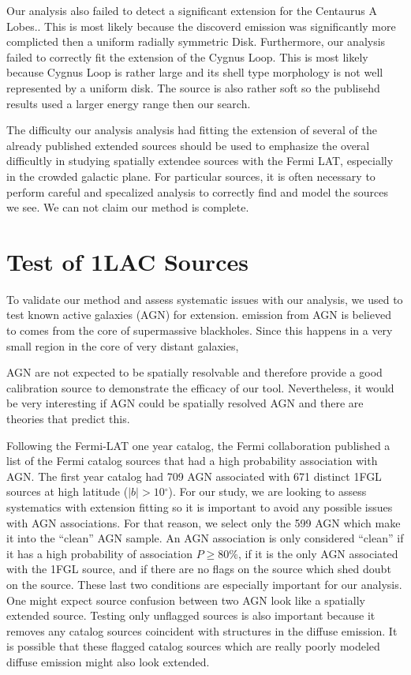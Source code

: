 \documentclass[12pt,preprint]{aastex}
\newcommand{\gev}{\text{GeV}\xspace}
\renewcommand{\deg}{\ensuremath{^\circ}\xspace}
\newcommand{\pointlike}{\text{\em pointlike}\xspace}
\begin{document}
Our analysis also failed to detect a significant extension for the
Centaurus A Lobes.\cite{CenA paper}. This is most likely because the
discoverd emission was significantly more complicted then a uniform
radially symmetric Disk.  Furthermore, our analysis failed to correctly
fit the extension of the Cygnus Loop\cite{Cygnus Loop Paper}.  This is
most likely because Cygnus Loop is rather large and its shell type
morphology is not well represented by a uniform disk. The source is
also rather soft so the publisehd results used a larger energy range
then our search.

The difficulty our analysis analysis had fitting the extension of several
of the already published extended sources should be used to emphasize the
overal difficultly in studying spatially extendee sources with the Fermi
LAT, especially in the crowded galactic plane. For particular sources,
it is often necessary to perform careful and specalized analysis to
correctly find and model the sources we see. We can not claim our method
is complete.

\section{Test of 1LAC Sources}

To validate our method and assess systematic issues with our
analysis, we used \pointlike to test known active galaxies (AGN) for extension.
\gev emission from AGN is believed to comes from the
core of supermassive blackholes. Since this happens in a very small region
in the core of very distant galaxies,

AGN are not expected to be spatially resolvable and therefore
provide a good calibration source to demonstrate the efficacy of our
tool. Nevertheless, it would be very interesting if AGN could be
spatially resolved AGN and there are theories that predict
this\cite{pair_halo_paper}.

Following the Fermi-LAT one year catalog, the Fermi collaboration
published a list of the Fermi catalog sources that had a high probability
association with AGN. The first year catalog had 709 AGN associated with
671 distinct 1FGL sources at high latitude ($|b|>10\deg$).  For our
study, we are looking to assess systematics with extension fitting so
it is important to avoid any possible issues with AGN associations.
For that reason, we select only the 599 AGN which make it into the
``clean'' AGN sample. An AGN association is only considered ``clean''
if it has a high probability of association $P\ge 80\%$, if it is the
only AGN associated with the 1FGL source, and if there are no flags
on the source which shed doubt on the source\cite{first_cat}. These last two
conditions are especially important for our analysis. One might expect
source confusion between two AGN look like a spatially extended source.
Testing only unflagged sources is also important because it removes
any catalog sources coincident with structures in the diffuse emission.
It is possible that these flagged catalog sources which are really poorly
modeled diffuse emission might also look extended.
\end{document}
